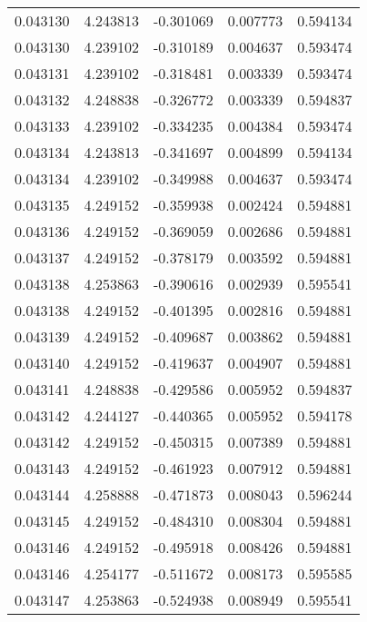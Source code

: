 \begin{tabular}{lrrrr}
0.043130    &  4.243813 & -0.301069 &  0.007773 &             0.594134 \\
0.043130    &  4.239102 & -0.310189 &  0.004637 &             0.593474 \\
0.043131    &  4.239102 & -0.318481 &  0.003339 &             0.593474 \\
0.043132    &  4.248838 & -0.326772 &  0.003339 &             0.594837 \\
0.043133    &  4.239102 & -0.334235 &  0.004384 &             0.593474 \\
0.043134    &  4.243813 & -0.341697 &  0.004899 &             0.594134 \\
0.043134    &  4.239102 & -0.349988 &  0.004637 &             0.593474 \\
0.043135    &  4.249152 & -0.359938 &  0.002424 &             0.594881 \\
0.043136    &  4.249152 & -0.369059 &  0.002686 &             0.594881 \\
0.043137    &  4.249152 & -0.378179 &  0.003592 &             0.594881 \\
0.043138    &  4.253863 & -0.390616 &  0.002939 &             0.595541 \\
0.043138    &  4.249152 & -0.401395 &  0.002816 &             0.594881 \\
0.043139    &  4.249152 & -0.409687 &  0.003862 &             0.594881 \\
0.043140    &  4.249152 & -0.419637 &  0.004907 &             0.594881 \\
0.043141    &  4.248838 & -0.429586 &  0.005952 &             0.594837 \\
0.043142    &  4.244127 & -0.440365 &  0.005952 &             0.594178 \\
0.043142    &  4.249152 & -0.450315 &  0.007389 &             0.594881 \\
0.043143    &  4.249152 & -0.461923 &  0.007912 &             0.594881 \\
0.043144    &  4.258888 & -0.471873 &  0.008043 &             0.596244 \\
0.043145    &  4.249152 & -0.484310 &  0.008304 &             0.594881 \\
0.043146    &  4.249152 & -0.495918 &  0.008426 &             0.594881 \\
0.043146    &  4.254177 & -0.511672 &  0.008173 &             0.595585 \\
0.043147    &  4.253863 & -0.524938 &  0.008949 &             0.595541 \\

\end{tabular}
